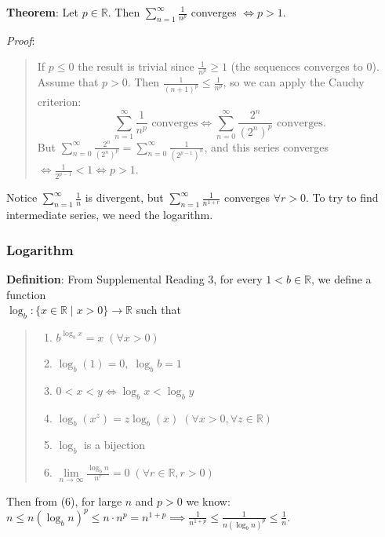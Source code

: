 \documentclass[11pt]{article}
\begin{document}
\textbf{Theorem}: Let $p \in \mathbb{R}$. Then $\sum_{n=1}^\infty \frac{1}{n^p}$ converges $\iff p > 1$.

\emph{Proof}:
\begin{quote}\vspace{-0.3cm}
If $p \leq 0$ the result is trivial since $\frac{1}{n^p} \geq 1$ (the sequences converges to 0). Assume that $p > 0$. Then $\frac{1}{(n+1)^p} \leq \frac{1}{n^p}$, so we can apply the Cauchy criterion:
\begin{displaymath}
\sum_{n=1}^\infty \frac{1}{n^p} \text{ converges} \iff \sum_{n=0}^\infty \frac{2^n}{(2^n)^p} \text{ converges.}
\end{displaymath}
But $\sum_{n=0}^\infty \frac{2^n}{(2^n)^p} = \sum_{n=0}^\infty \frac{1}{(2^{p-1})^n}$, and this series converges $\iff \frac{1}{2^{p-1}} < 1 \iff p > 1$.
\end{quote}

Notice $\sum_{n=1}^\infty \frac{1}{n}$ is divergent, but $\sum_{n=1}^\infty \frac{1}{n^{1+r}}$ converges $\forall r > 0$. To try to find intermediate series, we need the logarithm.

\subsubsection{Logarithm}

\textbf{Definition}: From Supplemental Reading 3, for every $1 < b \in \mathbb{R}$, we define a function\\
$\log_b : \{x \in \mathbb{R} \;|\; x > 0 \} \to \mathbb{R}$ such that
\begin{quote}\vspace{-0.3cm}
	\begin{enumerate}
	\item $b^{\log_b x} = x \;(\forall x > 0)$
	\item $\log_b(1) = 0,\; \log_b b = 1$
	\item $0 < x < y \iff \log_b x < \log_b y$
	\item $\log_b (x^z) = z \log_b (x) \;(\forall x > 0, \forall z \in \mathbb{R})$
	\item $\log_b$ is a bijection
	\item $\lim\limits_{n \to \infty} \frac{\log_b n}{n^r} = 0 \;(\forall r \in \mathbb{R}, r > 0)$
	\end{enumerate}
\end{quote}
Then from (6), for large $n$ and $p > 0$ we know:\\
$n \leq n (\log_b n)^p \leq n \cdot n^p = n^{1+p} \implies \frac{1}{n^{1+p}} \leq \frac{1}{n (\log_b n)^p} \leq \frac{1}{n}$.
\end{document}
